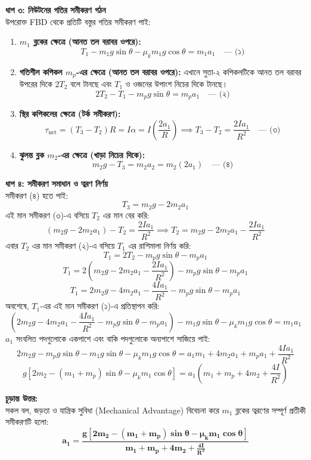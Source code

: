 \documentclass[12pt, a4paper]{article}
\begin{document}
\begin{tcolorbox}[solutionbox={সমাধান (Solution)}]
\noindent
\textbf{ধাপ ৩: নিউটনের গতির সমীকরণ গঠন} \\
উপরোক্ত FBD থেকে প্রতিটি বস্তুর গতির সমীকরণ পাই:
\begin{enumerate}[leftmargin=*, parsep=0.4ex]
    \item \textbf{$m_1$ ব্লকের ক্ষেত্রে (আনত তল বরাবর ওপরে):}
    \[ T_1 - m_1 g \sin\theta - \mu_k m_1 g \cos\theta = m_1 a_1 \quad \text{--- (১)} \]
    \item \textbf{গতিশীল কপিকল $m_p$-এর ক্ষেত্রে (আনত তল বরাবর ওপরে):}
    এখানে সুতা-২ কপিকলটিকে আনত তল বরাবর উপরের দিকে $2T_2$ বলে টানছে এবং $T_1$ ও ওজনের উপাংশ নিচের দিকে টানছে।
    \[ 2T_2 - T_1 - m_p g \sin\theta = m_p a_1 \quad \text{--- (২)} \]
    \item \textbf{স্থির কপিকলের ক্ষেত্রে (টর্ক সমীকরণ):}
    \[ \tau_{\text{net}} = (T_3 - T_2) R = I \alpha = I \left( \frac{2a_1}{R} \right) \implies T_3 - T_2 = \frac{2I a_1}{R^2} \quad \text{--- (৩)} \]
    \item \textbf{ঝুলন্ত ব্লক $m_2$-এর ক্ষেত্রে (খাড়া নিচের দিকে):}
    \[ m_2 g - T_3 = m_2 a_2 = m_2 (2a_1) \quad \text{--- (৪)} \]
\end{enumerate}

\noindent
\textbf{ধাপ ৪: সমীকরণ সমাধান ও ত্বরণ নির্ণয়} \\
সমীকরণ (৪) হতে পাই:
\[ T_3 = m_2 g - 2m_2 a_1 \]
এই মান সমীকরণ (৩)-এ বসিয়ে $T_2$ এর মান বের করি:
\[ (m_2 g - 2m_2 a_1) - T_2 = \frac{2I a_1}{R^2} \implies T_2 = m_2 g - 2m_2 a_1 - \frac{2I a_1}{R^2} \]
এবার $T_2$ এর মান সমীকরণ (২)-এ বসিয়ে $T_1$ এর রাশিমালা নির্ণয় করি:
\[ T_1 = 2T_2 - m_p g \sin\theta - m_p a_1 \]
\[ T_1 = 2 \left( m_2 g - 2m_2 a_1 - \frac{2I a_1}{R^2} \right) - m_p g \sin\theta - m_p a_1 \]
\[ T_1 = 2m_2 g - 4m_2 a_1 - \frac{4I a_1}{R^2} - m_p g \sin\theta - m_p a_1 \]
অবশেষে, $T_1$-এর এই মান সমীকরণ (১)-এ প্রতিস্থাপন করি:
\[ \left( 2m_2 g - 4m_2 a_1 - \frac{4I a_1}{R^2} - m_p g \sin\theta - m_p a_1 \right) - m_1 g \sin\theta - \mu_k m_1 g \cos\theta = m_1 a_1 \]
$a_1$ সংবলিত পদগুলোকে একপাশে এবং বাকি পদগুলোকে অন্যপাশে সাজিয়ে পাই:
\[ 2m_2 g - m_p g \sin\theta - m_1 g \sin\theta - \mu_k m_1 g \cos\theta = a_1 m_1 + 4m_2 a_1 + m_p a_1 + \frac{4I a_1}{R^2} \]
\[ g \left[ 2m_2 - (m_1 + m_p)\sin\theta - \mu_k m_1 \cos\theta \right] = a_1 \left( m_1 + m_p + 4m_2 + \frac{4I}{R^2} \right) \]

\vspace{1em}
\begin{tcolorbox}[answerbox]
\textbf{চূড়ান্ত উত্তর:} \\
সকল বল, জড়তা ও যান্ত্রিক সুবিধা (Mechanical Advantage) বিবেচনা করে $m_1$ ব্লকের ত্বরণের সম্পূর্ণ প্রতীকী সমীকরণটি হলো:
\[ \mathbf{a_1 = \frac{g \left[ 2m_2 - (m_1 + m_p)\sin\theta - \mu_k m_1 \cos\theta \right]}{m_1 + m_p + 4m_2 + \frac{4I}{R^2}}} \]
\end{tcolorbox}
\end{tcolorbox}
\end{document}
